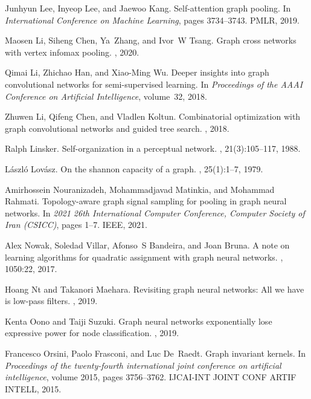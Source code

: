\documentclass{article}
\begin{document}
\begin{thebibliography}{999}
	Junhyun Lee, Inyeop Lee, and Jaewoo Kang.
	\newblock Self-attention graph pooling.
	\newblock In {\em International Conference on Machine Learning}, pages
	3734--3743. PMLR, 2019.
	
	Maosen Li, Siheng Chen, Ya~Zhang, and Ivor~W Tsang.
	\newblock Graph cross networks with vertex infomax pooling.
	, 2020.
	
	Qimai Li, Zhichao Han, and Xiao-Ming Wu.
	\newblock Deeper insights into graph convolutional networks for semi-supervised
	learning.
	\newblock In {\em Proceedings of the AAAI Conference on Artificial
		Intelligence}, volume~32, 2018.
	
	Zhuwen Li, Qifeng Chen, and Vladlen Koltun.
	\newblock Combinatorial optimization with graph convolutional networks and
	guided tree search.
	, 2018.
	
	Ralph Linsker.
	\newblock Self-organization in a perceptual network.
	, 21(3):105--117, 1988.
	
	L{\'a}szl{\'o} Lov{\'a}sz.
	\newblock On the shannon capacity of a graph.
	, 25(1):1--7, 1979.
	
	Amirhossein Nouranizadeh, Mohammadjavad Matinkia, and Mohammad Rahmati.
	\newblock Topology-aware graph signal sampling for pooling in graph neural
	networks.
	\newblock In {\em 2021 26th International Computer Conference, Computer Society
		of Iran (CSICC)}, pages 1--7. IEEE, 2021.
	
	Alex Nowak, Soledad Villar, Afonso~S Bandeira, and Joan Bruna.
	\newblock A note on learning algorithms for quadratic assignment with graph
	neural networks.
	, 1050:22, 2017.
	
	Hoang Nt and Takanori Maehara.
	\newblock Revisiting graph neural networks: All we have is low-pass filters.
	, 2019.
	
	Kenta Oono and Taiji Suzuki.
	\newblock Graph neural networks exponentially lose expressive power for node
	classification.
	, 2019.
	
	Francesco Orsini, Paolo Frasconi, and Luc De~Raedt.
	\newblock Graph invariant kernels.
	\newblock In {\em Proceedings of the twenty-fourth international joint
		conference on artificial intelligence}, volume 2015, pages 3756--3762.
	IJCAI-INT JOINT CONF ARTIF INTELL, 2015.
	

\end{thebibliography}
\end{document}
